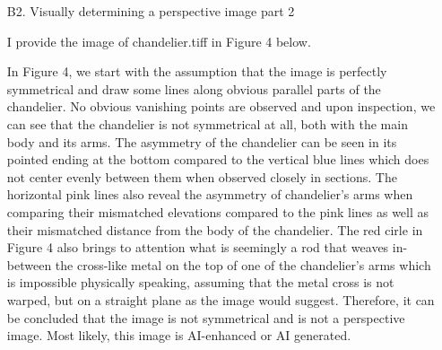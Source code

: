 \documentclass[12pt]{report}
\begin{document}
\begin{enumerate}
  \newpage
\item[B2.] Visually determining a perspective image part 2
  
  I provide the image of chandelier.tiff in Figure 4 below.
  \begin{figure}[h!]
    \centering
  \end{figure}
  
  In Figure 4, we start with the assumption that the image is perfectly
  symmetrical and draw some lines along obvious parallel parts of the
  chandelier. No obvious vanishing points are observed and upon inspection, we
  can see that the chandelier is not symmetrical at all, both with the main body
  and its arms. The asymmetry of the chandelier can be seen in its pointed
  ending at the bottom compared to the vertical blue lines which does not center
  evenly between them when observed closely in sections. The horizontal pink
  lines also reveal the asymmetry of chandelier's arms when comparing their
  mismatched elevations compared to the pink lines as well as their mismatched
  distance from the body of the chandelier. The red cirle in Figure 4 also
  brings to attention what is seemingly a rod that weaves in-between the
  cross-like metal on the top of one of the chandelier's arms which is
  impossible physically speaking, assuming that the metal cross is not warped,
  but on a straight plane as the image would suggest. Therefore, it can be
  concluded that the image is not symmetrical and is not a perspective
  image. Most likely, this image is AI-enhanced or AI generated.
\end{enumerate}
\end{document}

